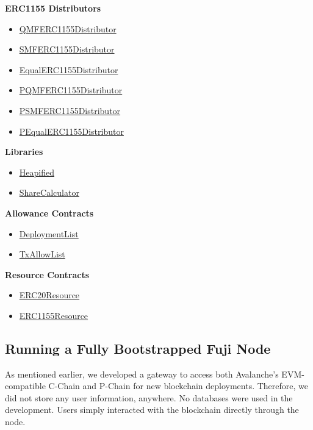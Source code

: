\documentclass[a4paper,12pt]{report}
\begin{document}
\textbf{ERC1155 Distributors}
\begin{itemize}
	\item \href{https://testnet.snowtrace.io/address/0x7CC306949b2908b543377268e8F98865a72BDb93}{QMFERC1155Distributor}
	\item \href{https://testnet.snowtrace.io/address/0xA497D8079dE4E323361e119A3d540113f051A0DB}{SMFERC1155Distributor}
	\item \href{https://testnet.snowtrace.io/address/0x870921CEE8465B9920A904ff762d605eC0d929Fb}{EqualERC1155Distributor}
	\item \href{https://testnet.snowtrace.io/address/0x1f409a3848Ce2052c15e5AD94419aF4c7819E96F}{PQMFERC1155Distributor}
	\item \href{https://testnet.snowtrace.io/address/0xc09D7EAdfaE4f1E80D04D52113B8767322fDB9eC}{PSMFERC1155Distributor}
	\item \href{https://testnet.snowtrace.io/address/0x169548d82919Db3aD3cE037277DD450447858e90}{PEqualERC1155Distributor}
\end{itemize}

\textbf{Libraries}
\begin{itemize}
	\item \href{https://testnet.snowtrace.io/address/0x3e388dd91ce0714c427bad7ad128fbfc588b2ae2}{Heapified}
	\item \href{https://testnet.snowtrace.io/address/0x30fbd74b5ea995a279416c16e02f281bb478837b}{ShareCalculator}
\end{itemize}

\textbf{Allowance Contracts}
\begin{itemize}
	\item \href{https://testnet.snowtrace.io/address/0x0f8cfd4d5a0807d3f9f0a29afd52b9b5b6db6e37}{DeploymentList}
	\item \href{https://testnet.snowtrace.io/address/0xa14b962542b3f0518cd89dd93ecc86ba53b3d371}{TxAllowList}
\end{itemize}

\textbf{Resource Contracts}
\begin{itemize}
	\item \href{https://testnet.snowtrace.io/address/0xcd1c77b27f488bb225b1c604629918d0240c2c3a}{ERC20Resource}
	\item \href{https://testnet.snowtrace.io/address/0x38A244Ef32099fB90C15D22c1BEE33bE14d185bF}{ERC1155Resource}
\end{itemize}

\subsection{Running a Fully Bootstrapped Fuji Node}
As mentioned earlier, we developed a gateway to access both Avalanche’s EVM-compatible C-Chain and P-Chain for new blockchain deployments. Therefore, we did not store any user information, anywhere. No databases were used in the development. Users simply interacted with the blockchain directly through the node.
\end{document}
